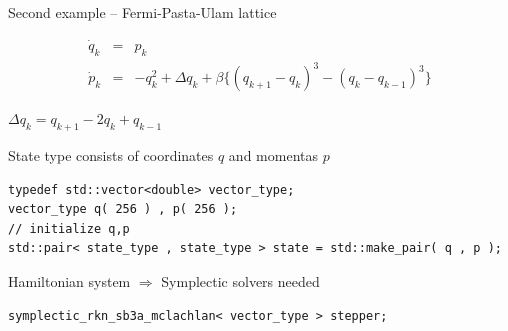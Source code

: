 \documentclass{beamer}
\newcommand{\rem}[1]{}
\begin{document}
\begin{frame}[fragile]{Second example -- Fermi-Pasta-Ulam lattice}
 
  \vspace{-4ex} 
 
  \begin{eqnarray}
   \dot{q}_k & = & p_k  \nonumber \\
   \dot{p}_k & = & - q_k^2 + \Delta q_k + \beta \big\{ ( q_{k+1} - q_k )^3 - ( q_k - q_{k-1} )^3 \big\} \nonumber
  \end{eqnarray}

  \centerline{\rem{Discrete Laplacian} $\Delta q_k = q_{k+1} -2 q_k + q_{k-1}$}

  \vspace{4ex}

  \pause

State type consists of coordinates $q$ and momentas $p$

  \vspace{1ex}

  \begin{lstlisting}
typedef std::vector<double> vector_type;
vector_type q( 256 ) , p( 256 );
// initialize q,p
std::pair< state_type , state_type > state = std::make_pair( q , p );
  \end{lstlisting}

  \pause

  \vspace{2ex}

  Hamiltonian system $\Longrightarrow{}$ Symplectic solvers needed

  \vspace{1ex}

  \begin{lstlisting}
symplectic_rkn_sb3a_mclachlan< vector_type > stepper;
  \end{lstlisting}


\end{frame}
\end{document}
